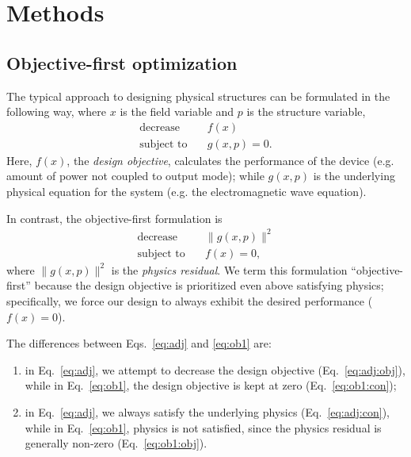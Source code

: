 \documentclass[letterpaper,10pt]{article}
\begin{document}
\section{Methods}
\subsection{Objective-first optimization}
The typical approach to designing physical structures can be formulated 
    in the following way, 
    where $x$ is the field variable and $p$ is the structure variable,
    \begin{subequations}\label{eq:adj}
    \begin{align} 
    \text{decrease} & \quad f(x) \label{eq:adj:obj} \\ 
    \text{subject to} & \quad g(x,p) = 0. \label{eq:adj:con}
    \end{align}
    \end{subequations}
Here, $f(x)$, the \emph{design objective}, 
    calculates the performance of the device 
    (e.g. amount of power not coupled to output mode); 
    while $g(x,p)$ is the underlying physical equation for the system
    (e.g. the electromagnetic wave equation).

In contrast, the objective-first formulation is
    \begin{subequations}\label{eq:ob1}
    \begin{align} 
    \text{decrease} & \quad \|g(x,p)\|^2 \label{eq:ob1:obj} \\ 
    \text{subject to} & \quad f(x) = 0, \label{eq:ob1:con}
    \end{align}
    \end{subequations}
    where $\|g(x,p)\|^2$ is the \emph{physics residual}.
We term this formulation ``objective-first''
    because the design objective is prioritized even above satisfying physics;
    specifically, we force our design to always exhibit the desired performance
    ($f(x) = 0$).

The differences between Eqs.~\ref{eq:adj} and \ref{eq:ob1} are:
\begin{enumerate}
    \item in Eq.~\ref{eq:adj}, we attempt to decrease the design objective 
            (Eq.~\ref{eq:adj:obj}), 
        while in Eq.~\ref{eq:ob1}, the design objective is kept at zero 
            (Eq.~\ref{eq:ob1:con}); 
    \item in Eq.~\ref{eq:adj}, we always satisfy the underlying physics 
            (Eq.~\ref{eq:adj:con}),
        while in Eq.~\ref{eq:ob1}, physics is not satisfied,
            since the physics residual is generally non-zero
            (Eq.~\ref{eq:ob1:obj}).
\end{enumerate}
\end{document}

